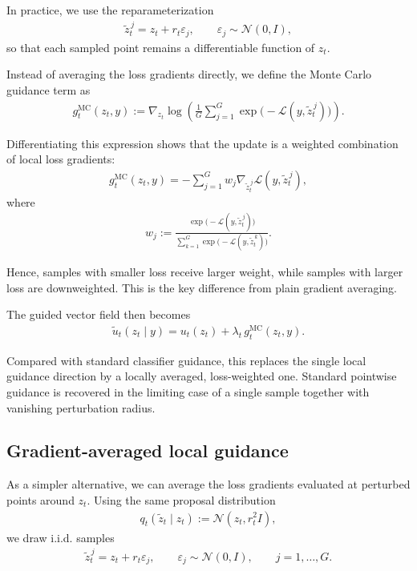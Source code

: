 \documentclass[a4paper,12pt]{article}
\begin{document}
In practice, we use the reparameterization
\begin{align*}
\tilde{z}_t^{\,j} = z_t + r_t \varepsilon_j,
\qquad
\varepsilon_j \sim \mathcal{N}(0,I),
\end{align*}
so that each sampled point remains a differentiable function of $z_t$.

Instead of averaging the loss gradients directly, we define the Monte Carlo guidance term as
\begin{align*}
g_t^{\mathrm{MC}}(z_t, y)
:=
\nabla_{z_t}
\log \left(
\frac{1}{G}\sum_{j=1}^G
\exp\bigl(-\mathcal{L}(y,\tilde{z}_t^{\,j})\bigr)
\right).
\end{align*}

Differentiating this expression shows that the update is a weighted combination of local loss gradients:
\begin{align*}
g_t^{\mathrm{MC}}(z_t, y)
=
-\sum_{j=1}^G
w_j
\nabla_{\tilde{z}_t^{\,j}}
\mathcal{L}(y,\tilde{z}_t^{\,j}),
\end{align*}
where
\begin{align*}
w_j
:=
\frac{\exp\bigl(-\mathcal{L}(y,\tilde{z}_t^{\,j})\bigr)}
{\sum_{k=1}^G \exp\bigl(-\mathcal{L}(y,\tilde{z}_t^{\,k})\bigr)}.
\end{align*}

Hence, samples with smaller loss receive larger weight, while samples with larger loss are downweighted.
This is the key difference from plain gradient averaging.

The guided vector field then becomes
\begin{align*}
\tilde{u}_t(z_t \mid y)
=
u_t(z_t) + \lambda_t \, g_t^{\mathrm{MC}}(z_t, y).
\end{align*}

Compared with standard classifier guidance, this replaces the single local guidance direction by a locally averaged, loss-weighted one.
Standard pointwise guidance is recovered in the limiting case of a single sample together with vanishing perturbation radius.

\subsection{Gradient-averaged local guidance}

As a simpler alternative, we can average the loss gradients evaluated at perturbed points around $z_t$.
Using the same proposal distribution
\begin{align*}
q_t(\tilde{z}_t \mid z_t) := \mathcal{N}(z_t, r_t^2 I),
\end{align*}
we draw i.i.d. samples
\begin{align*}
\tilde{z}_t^{\,j} = z_t + r_t \varepsilon_j,
\qquad
\varepsilon_j \sim \mathcal{N}(0,I),
\qquad j=1,\dots,G.
\end{align*}
\end{document}
